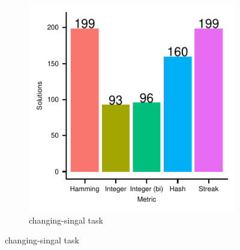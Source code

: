 \begin{figure}
\begin{minipage}{0.25\textwidth}

\begin{subfigure}[b]{\linewidth}
\centering
\includegraphics[width=\linewidth]{img/gp_results/panel-cst-sols.pdf}%
\caption{
changing-singal task
}
\label{fig:cst-sols}
\end{subfigure}


\end{minipage}
\end{figure}
